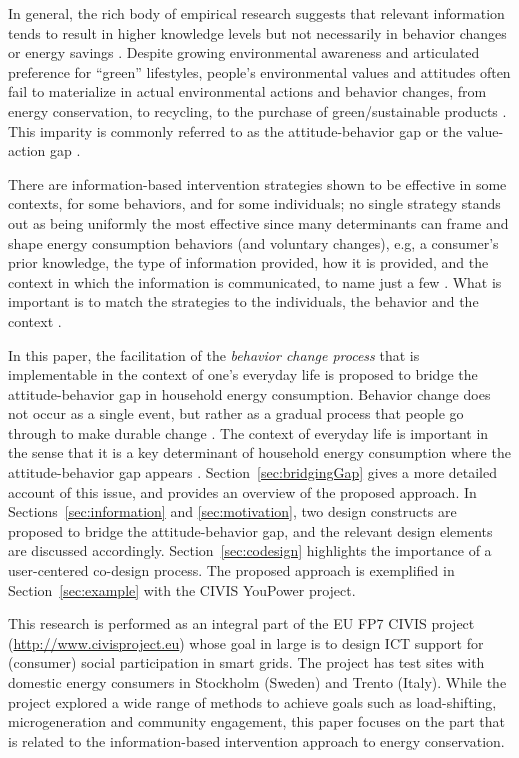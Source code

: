 \documentclass[a4paper]{article}
\begin{document}
In general, the rich body of empirical research suggests that relevant information tends to result in higher knowledge levels but not necessarily in behavior changes or energy savings \citep{Abrahamse2005,+}. Despite growing environmental awareness and articulated preference for ``green'' lifestyles, people's environmental values and attitudes often fail to materialize in actual environmental actions and behavior changes, from energy conservation, to recycling,  to the purchase of green/sustainable products \citep{Schultz2002,Abrahamse2005,Claudy2013}. This imparity is commonly referred to as the attitude-behavior gap or the value-action gap \citep{Blake1999,Kollmuss2002,Claudy2013}. 

There are information-based intervention strategies shown to be effective in some contexts, for some behaviors, and for some individuals; no single strategy stands out as being uniformly the most effective \citep{Schultz2014} since many determinants can frame and shape energy consumption behaviors (and voluntary changes), e.g, a consumer's prior knowledge, the type of information provided, how it is provided, and the context in which the information is communicated, to name just a few \citep{Delmas2013,+}. What is important is to match the strategies to the individuals, the behavior and the context \citep{Schultz2014}. 

In this paper, the facilitation of the \textit{behavior change process} that is implementable in the context of one's everyday life is proposed to bridge the attitude-behavior gap in household energy consumption. Behavior change does not occur as a single event, but rather as a gradual process that people go through to make durable change \citep{Niedderer2014}. The context of everyday life is important in the sense that it is a key determinant of household energy consumption where the attitude-behavior gap appears \citep{Burchell2014,Selvefors2015}. Section~\ref{sec:bridgingGap} gives a more detailed account of this issue, and provides an overview of the proposed approach. In Sections~\ref{sec:information} and \ref{sec:motivation}, two design constructs are proposed to bridge the attitude-behavior gap, and the relevant design elements are discussed accordingly. Section~\ref{sec:codesign} highlights the importance of a user-centered co-design process. The proposed approach is exemplified in Section~\ref{sec:example} with the CIVIS YouPower project.

This research is performed as an integral part of the EU FP7 CIVIS project (\url{http://www.civisproject.eu}) whose goal in large is to design ICT support for (consumer) social participation in smart grids. The project has test sites with domestic energy consumers in Stockholm (Sweden) and Trento (Italy). While the project explored a wide range of methods to achieve goals such as load-shifting, microgeneration and community engagement, this paper focuses on the part that is related to the information-based intervention approach to energy conservation.
\end{document}
